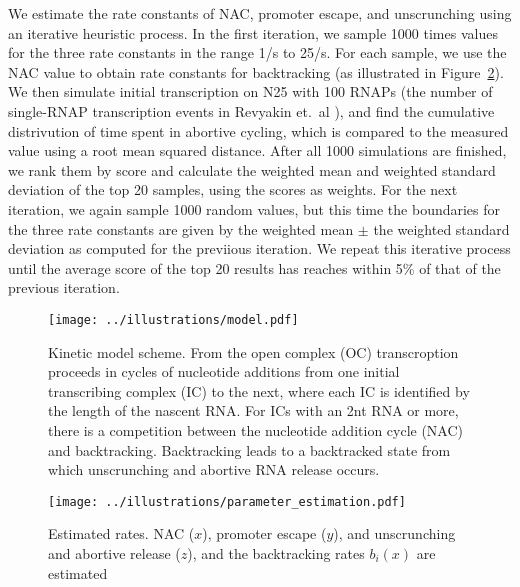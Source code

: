 We estimate the rate constants of NAC, promoter escape, and unscrunching using an
iterative heuristic process. In the first iteration, we sample 1000 times
values for the three rate constants in the range 1/s to 25/s. For each sample,
we use the NAC value to obtain rate constants for backtracking (as illustrated
in Figure~\ref{fig:parameter_estimation}). We then simulate initial
transcription on N25 with 100 RNAPs (the number of single-RNAP transcription
events in Revyakin et.\ al \cite{revyakin_abortive_2006}), and find the
cumulative distrivution of time spent in abortive cycling, which is compared
to the measured value using a root mean squared distance. After all 1000
simulations are finished, we rank them by score and calculate the weighted
mean and weighted standard deviation of the top 20 samples, using the scores
as weights. For the next iteration, we again sample 1000 random values, but
this time the boundaries for the three rate constants are given by the
weighted mean $\pm$ the weighted standard deviation as computed for the
previious iteration. We repeat this iterative process until the average score
of the top 20 results has reaches within 5\% of that of the previous iteration.

\begin{figure}
	\begin{center}
        \texttt{[image: ../illustrations/model.pdf]}
	\end{center}
    \caption{Kinetic model scheme. From the open complex (OC)
    transcroption proceeds in cycles of nucleotide additions from one initial
    transcribing complex (IC) to the next, where each IC is identified by the
    length of the nascent RNA. For ICs with an 2nt RNA or more, there is a
    competition between the nucleotide addition cycle (NAC) and backtracking.
    Backtracking leads to a backtracked state from which unscrunching and
    abortive RNA release occurs.}
    \label{fig:model}
\end{figure}

\begin{figure}
	\begin{center}
        \texttt{[image: ../illustrations/parameter\_estimation.pdf]}
	\end{center}
    \caption{Estimated rates. NAC ($x$), promoter escape ($y$), and
    unscrunching and abortive release ($z$), and the backtracking rates
    $b_i(x)$ are estimated}
    \label{fig:parameter_estimation}
\end{figure}
%
